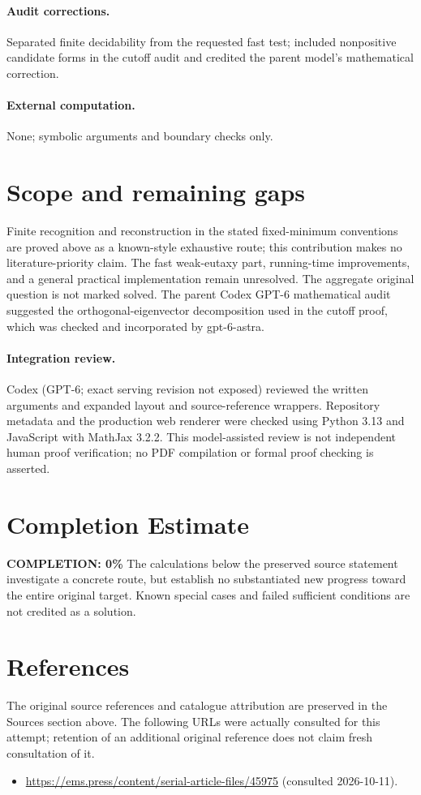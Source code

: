 \documentclass[11pt]{article}
\begin{document}
\paragraph{Audit corrections.} Separated finite decidability from the requested fast test; included nonpositive candidate forms in the cutoff audit and credited the parent model's mathematical correction.
\paragraph{External computation.} None; symbolic arguments and boundary checks only.
\section{Scope and remaining gaps}
Finite recognition and reconstruction in the stated fixed-minimum conventions are proved above as a known-style exhaustive route; this contribution makes no literature-priority claim. The fast weak-eutaxy part, running-time improvements, and a general practical implementation remain unresolved. The aggregate original question is not marked solved. The parent Codex GPT-6 mathematical audit suggested the orthogonal-eigenvector decomposition used in the cutoff proof, which was checked and incorporated by gpt-6-astra.
\paragraph{Integration review.} Codex (GPT-6; exact serving revision not exposed) reviewed the written arguments and expanded layout and source-reference wrappers. Repository metadata and the production web renderer were checked using Python 3.13 and JavaScript with MathJax 3.2.2. This model-assisted review is not independent human proof verification; no PDF compilation or formal proof checking is asserted.

\section{Completion Estimate}
\noindent\textbf{COMPLETION: 0\%}
The calculations below the preserved source statement investigate a concrete route,
but establish no substantiated new progress toward the entire original target.
Known special cases and failed sufficient conditions are not credited as a solution.
\section{References}
The original source references and catalogue attribution are preserved in the
Sources section above. The following URLs were actually consulted for this attempt;
retention of an additional original reference does not claim fresh consultation of it.
\begin{itemize}
\item \url{https://ems.press/content/serial-article-files/45975} (consulted 2026-10-11). 
\end{itemize}
\end{document}
